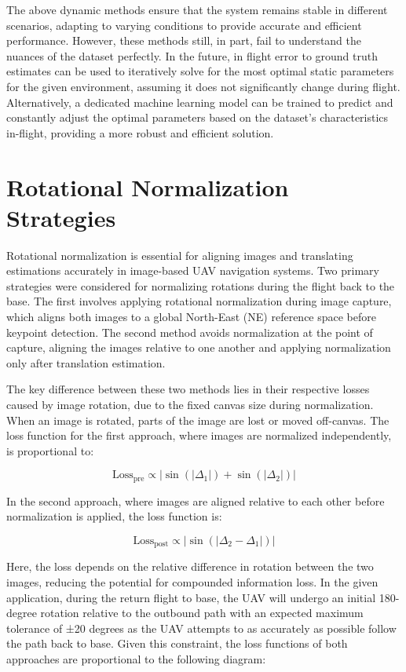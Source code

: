 The above dynamic methods ensure that the system remains stable in different scenarios, adapting to varying conditions to provide accurate and efficient performance. However, these methods still, in part, fail to understand the nuances of the dataset perfectly. In the future, in flight error to ground truth estimates can be used to iteratively solve for the most optimal static parameters for the given environment, assuming it does not significantly change during flight. Alternatively, a dedicated machine learning model can be trained to predict and constantly adjust the optimal parameters based on the dataset's characteristics in-flight, providing a more robust and efficient solution.


\section{Rotational Normalization Strategies}

Rotational normalization is essential for aligning images and translating estimations accurately in image-based UAV navigation systems. Two primary strategies were considered for normalizing rotations during the flight back to the base. The first involves applying rotational normalization during image capture, which aligns both images to a global North-East (NE) reference space before keypoint detection. The second method avoids normalization at the point of capture, aligning the images relative to one another and applying normalization only after translation estimation.

The key difference between these two methods lies in their respective losses caused by image rotation, due to the fixed canvas size during normalization. When an image is rotated, parts of the image are lost or moved off-canvas. 
The loss function for the first approach, where images are normalized independently, is proportional to:

\begin{equation}
\text{Loss}_{\text{pre}} \propto |\sin(|\Delta_1|) + \sin(|\Delta_2|)|
\end{equation}

In the second approach, where images are aligned relative to each other before normalization is applied, the loss function is:

\begin{equation}
\text{Loss}_{\text{post}} \propto |\sin(|\Delta_2 - \Delta_1|)|
\end{equation}


Here, the loss depends on the relative difference in rotation between the two images, reducing the potential for compounded information loss. In the given application, during the return flight to base, the UAV will undergo an initial 180-degree rotation relative to the outbound path with an expected maximum tolerance of ±20 degrees as the UAV attempts to as accurately as possible follow the path back to base. Given this constraint, the loss functions of both approaches are proportional to the following diagram:

